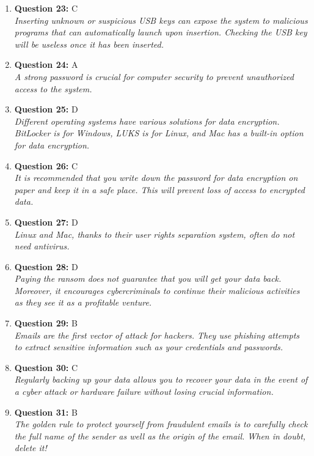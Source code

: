 \documentclass[12pt,a4paper]{article}
\begin{document}
\begin{enumerate}
\item \textbf{Question 23:} C
\\ \textit{Inserting unknown or suspicious USB keys can expose the
system to malicious programs that can automatically launch
upon insertion. Checking the USB key will be useless once
it has been inserted.}

\item \textbf{Question 24:} A
\\ \textit{A strong password is crucial for computer security to
prevent unauthorized access to the system.}

\item \textbf{Question 25:} D
\\ \textit{Different operating systems have various solutions for data encryption. BitLocker is for Windows, LUKS is for Linux, and Mac has a built-in option for data encryption.}

\item \textbf{Question 26:} C
\\ \textit{It is recommended that you write down the password for data encryption on paper and keep it in a safe place. This will prevent loss of access to encrypted data.}

\item \textbf{Question 27:} D
\\ \textit{Linux and Mac, thanks to their user rights separation
system, often do not need antivirus.}

\item \textbf{Question 28:} D
\\ \textit{Paying the ransom does not guarantee that you will get your data back. Moreover, it encourages cybercriminals to continue their malicious activities as they see it as a profitable venture.}

\item \textbf{Question 29:} B
\\ \textit{Emails are the first vector of attack for hackers. They use
phishing attempts to extract sensitive information such as
your credentials and passwords.}

\item \textbf{Question 30:} C
\\ \textit{Regularly backing up your data allows you to recover your data in the event of a cyber attack or hardware failure without losing crucial information.}

\item \textbf{Question 31:} B
\\ \textit{The golden rule to protect yourself from fraudulent emails
is to carefully check the full name of the sender as well
as the origin of the email. When in doubt, delete it!}


\end{enumerate}
\end{document}
